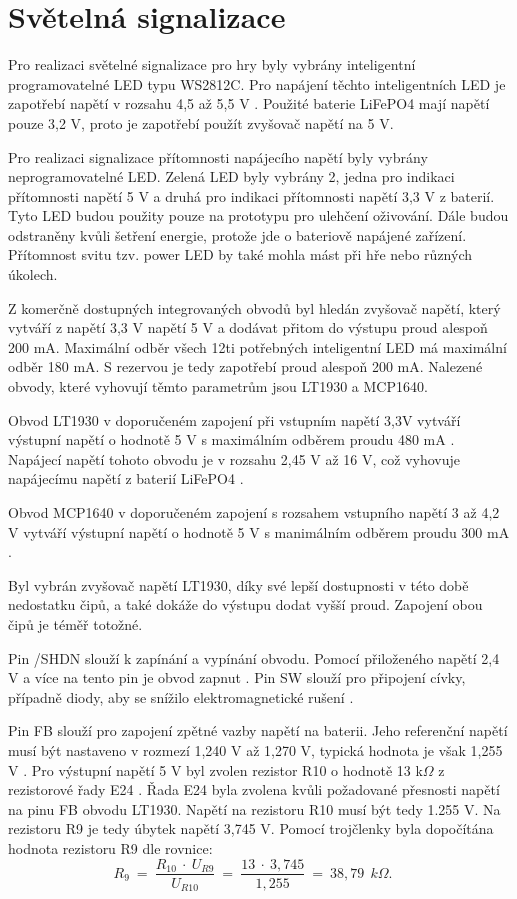 \section{Světelná signalizace}
Pro realizaci světelné signalizace pro hry byly vybrány inteligentní programovatelné LED typu WS2812C.
Pro napájení těchto inteligentních LED je zapotřebí napětí v rozsahu 4,5 až 5,5 V \cite{WS2812C_dtsh}. 
Použité baterie LiFePO4 mají napětí pouze 3,2 V, proto je zapotřebí použít zvyšovač napětí na 5 V. 

Pro realizaci signalizace přítomnosti napájecího napětí byly vybrány neprogramovatelné LED. Zelená LED byly vybrány 2, jedna pro indikaci přítomnosti napětí 5 V a druhá
pro indikaci přítomnosti napětí 3,3 V z baterií. Tyto LED budou použity pouze na prototypu pro ulehčení oživování. Dále budou odstraněny kvůli šetření energie, protože jde
o bateriově napájené zařízení. Přítomnost svitu tzv. power LED by také mohla mást při hře nebo různých úkolech.

Z komerčně dostupných integrovaných obvodů byl hledán zvyšovač napětí, který vytváří z napětí 3,3 V napětí 5 V a dodávat přitom do výstupu proud alespoň 200 mA. 
Maximální odběr všech 12ti potřebných inteligentní LED má maximální odběr 180 mA. S rezervou je tedy zapotřebí proud alespoň 200 mA. Nalezené obvody, které vyhovují 
těmto parametrům jsou LT1930 a MCP1640. 

Obvod LT1930 v doporučeném zapojení při vstupním napětí 3,3V vytváří výstupní napětí o hodnotě 5 V s maximálním odběrem proudu 480 mA \cite{LT1930_dtsh}. Napájecí napětí 
tohoto obvodu je v rozsahu 2,45 V až 16 V, což vyhovuje napájecímu napětí z baterií LiFePO4 \cite{LT1930_dtsh}.

Obvod MCP1640 v doporučeném zapojení s rozsahem vstupního napětí 3 až 4,2 V vytváří výstupní napětí o hodnotě 5 V s manimálním odběrem proudu 300 mA \cite{MCP1640_dtsh}.

Byl vybrán zvyšovač napětí LT1930, díky své lepší dostupnosti v této době nedostatku čipů, a také dokáže do výstupu dodat vyšší proud. Zapojení obou čipů je téměř totožné. 

Pin /SHDN slouží k zapínání a vypínání obvodu. Pomocí přiloženého napětí 2,4 V a více na tento pin je obvod zapnut \cite{LT1930_dtsh}. Pin SW slouží pro  připojení cívky, 
případně diody, aby se snížilo elektromagnetické rušení \cite{LT1930_dtsh}. 

Pin FB slouží  pro zapojení zpětné vazby napětí na baterii. Jeho referenční napětí musí být nastaveno v rozmezí 1,240 V až 1,270 V, typická hodnota je však 1,255 V \cite{LT1930_dtsh}. 
Pro výstupní napětí 5 V byl zvolen rezistor R10 o hodnotě 13 k$\Omega$ z rezistorové řady E24 \cite{rezistorova_rada}. Řada E24 byla zvolena kvůli požadované přesnosti
napětí na pinu FB obvodu LT1930. Napětí na rezistoru R10 musí být tedy 1.255 V. Na rezistoru R9 je tedy úbytek napětí 3,745 V. Pomocí trojčlenky byla dopočítána hodnota 
rezistoru R9 dle rovnice:
\begin{equation} 
  R_{9}~=~\frac{R_{10}~\cdot~U_{R9}}{U_{R10}}~=~\frac{13~\cdot~3,745}{1,255}~=~38,79~\:k\Omega. 
  \quad
\label{eq:R9}
\end{equation}

